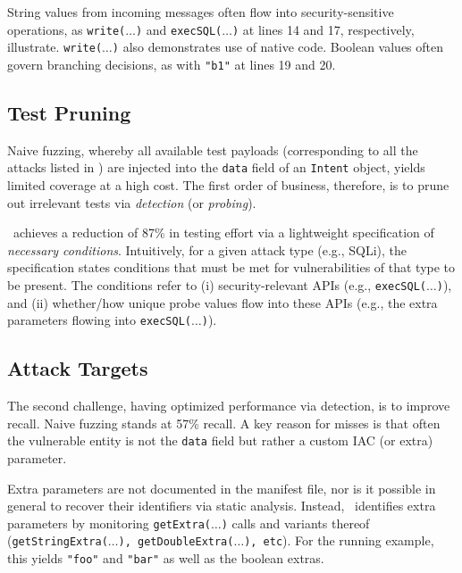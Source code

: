 String values from incoming messages often flow into security-sensitive operations, as {\tt write($\ldots$)} and {\tt execSQL($\ldots$)} at lines 14 and 17, respectively, illustrate. {\tt write($\ldots$)} also demonstrates use of native code.	Boolean values often govern branching decisions, as with {\tt "b1"} at lines 19 and 20.

\subsection{Test Pruning}

Naive fuzzing, whereby all available test payloads (corresponding to all the attacks listed in ) are injected into the {\tt data} field of an {\tt Intent} object, 
yields limited coverage at a high cost. The first order of business, therefore, is to prune out irrelevant tests via \emph{detection} (or \emph{probing}). 

\Tool\ achieves a reduction of 87\% in testing effort via a lightweight specification of \emph{necessary conditions}. Intuitively, for a given attack type (e.g., SQLi), the specification states conditions that must be met for vulnerabilities of that type to be present. The conditions refer to (i) security-relevant APIs (e.g., {\tt execSQL($\ldots$)}), and (ii) whether/how unique probe values flow into these APIs (e.g., the extra parameters flowing into {\tt execSQL($\ldots$)}).

\subsection{Attack Targets}

The second challenge, having optimized performance via detection, is to improve recall. Naive fuzzing stands at 57\% recall. A key reason for misses is that often the vulnerable entity is not the 
{\tt data} field but rather a custom IAC (or extra) parameter.

Extra parameters are not documented in the manifest file, nor is it possible in general to recover their identifiers via static analysis. Instead, \Tool\ identifies extra parameters by monitoring {\tt getExtra($\ldots$)} calls and variants thereof ({\tt getStringExtra($\ldots$), getDoubleExtra($\ldots$), etc}). For the running example, this yields {\tt "foo"} and {\tt "bar"} as well as the boolean extras.
%

